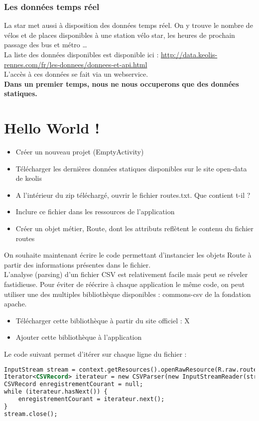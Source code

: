 \documentclass{article}
\begin{document}
\subsubsection{Les données temps réel}
La star met aussi à disposition des données temps réel. On y trouve le nombre de
vélos et de places disponibles à une station vélo star, les heures de prochain
passage des bus et métro \ldots\\
La liste des données disponibles est disponible ici : 
\href{http://data.keolis-rennes.com/fr/les-donnees/donnees-et-api.html}{http://data.keolis-rennes.com/fr/les-donnees/donnees-et-api.html}\\
L'accès à ces données se fait via un webservice.\\
\textbf{Dans un premier temps, nous ne nous occuperons que des données
statiques.}
\section{Hello World !}
\begin{itemize} 
  \item Créer un nouveau projet (EmptyActivity)
  \item Télécharger les dernières données statiques disponibles sur le site
  open-data de keolis
  \item A l'intérieur du zip téléchargé, ouvrir le fichier routes.txt. Que
  contient t-il ?
  \item Inclure ce fichier dans les ressources de l'application
  \item Créer un objet métier, Route, dont les attributs reflètent le contenu du
  fichier routes
\end{itemize}
On souhaite maintenant écrire le code permettant d'instancier les objets Route à
partir des informations présentes dans le fichier.\\
L'analyse (parsing) d'un fichier CSV est relativement facile mais peut se
réveler fastidieuse. Pour éviter de réécrire à chaque application le même code, on peut utiliser une des multiples bibliothèque disponibles : commons-csv de la
fondation apache.
\begin{itemize}
  \item Télécharger cette bibliothèque à partir du site officiel : X
  \item Ajouter cette bibliothèque à l'application
\end{itemize}
Le code suivant permet d'itérer sur chaque ligne du fichier :\\
\begin{lstlisting}[language=XML]
InputStream stream = context.getResources().openRawResource(R.raw.routes);
Iterator<CSVRecord> iterateur = new CSVParser(new InputStreamReader(stream), CSVFormat.DEFAULT).iterator();
CSVRecord enregistrementCourant = null;
while (iterateur.hasNext()) {
    enregistrementCourant = iterateur.next();
}
stream.close();
\end{lstlisting}
\end{document}
